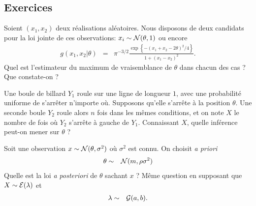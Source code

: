 \documentclass[10pt]{article}
\begin{document}

\subsection{Exercices}

\begin{exec}\label{exo1}
            Soient $(x_1,x_2)$ deux réalisations aléatoires. Nous disposons de deux candidats pour la loi jointe de ces observations: $x_i\sim {\cal{N}}(\theta,1)$ ou encore
            \begin{eqnarray*}
g(x_1,x_2|\theta) & = & \pi^{-3/2}\frac{\exp\left\{-(x_1 + x_2 - 2\theta)^2/4\right\}}{1+(x_1-x_2)^2}.
\end{eqnarray*}
Quel est l'estimateur du maximum de vraisemblance de $\theta$ dans chacun des cas ? Que constate-on ?
        \end{exec}
 

\begin{exec}[Bayes (1763)]\label{exo2}
Une boule de billard $Y_1$ roule sur une ligne de longueur $1$, avec une probabilité uniforme de s'arr\^eter n'importe où. Supposons qu'elle s'arr\^ete à la position $\theta$. Une seconde boule $Y_2$ roule alors $n$ fois dans les m\^emes conditions, et on note $X$ le nombre de fois où $Y_2$ s'arr\^ete à gauche de $Y_1$. Connaissant $X$, quelle inférence peut-on mener sur $\theta$ ?
\end{exec}
 
\begin{exec}\label{exo3}
Soit une observation $x\sim{\cal{N}}(\theta,\sigma^2)$ où $\sigma^2$ est connu. On choisit {\it a priori}
\begin{eqnarray*}
\theta & \sim & {\cal{N}}(m,\rho\sigma^2)
\end{eqnarray*} 
Quelle est la loi {\it a posteriori} de $\theta$ sachant $x$ ? Même question en supposant que $X\sim {\cal{E}}(\lambda)$ et
\begin{eqnarray*}
\lambda & \sim & {\cal{G}}(a,b).
\end{eqnarray*}
\end{exec}
% 
\end{document}

